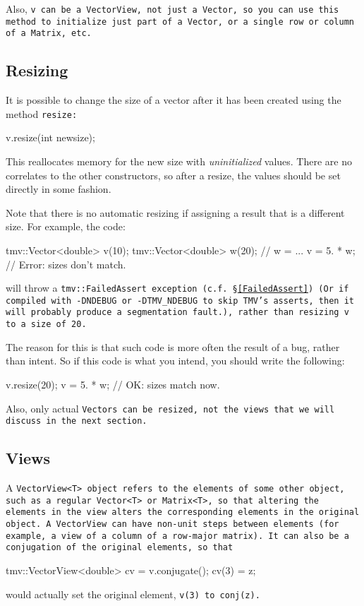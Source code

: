Also, \tt{v} can be a \tt{VectorView}, not just a \tt{Vector}, so you can use this method to 
initialize just part of a \tt{Vector}, or a single row or column of a \tt{Matrix}, etc.

\subsection{Resizing}
\label{Vector_Resize}

It is possible to change the size of a vector after it has been created using the method \tt{resize}:

\begin{tmvcode}
v.resize(int newsize);
\end{tmvcode}
This reallocates memory for the new size with {\em uninitialized} values.  
There are no correlates to the other constructors, so after a resize, the 
values should be set directly in some fashion.

Note that there is no automatic resizing if assigning a result that is a different size. 
For example, the code:
\begin{tmvcode}
tmv::Vector<double> v(10);
tmv::Vector<double> w(20);
// w = ...
v = 5. * w;  // Error: sizes don't match.
\end{tmvcode}
will throw a \tt{tmv::FailedAssert} exception (c.f. \S\ref{FailedAssert}) (Or if compiled with 
\tt{-DNDEBUG} or \tt{-DTMV\_NDEBUG} to skip TMV's asserts, then it will probably produce a segmentation fault.),
rather than resizing \tt{v} to a size of 20.  

The reason for this is that such code is more often the result of a bug, rather than intent.
So if this code is what you intend, you should write the following:
\begin{tmvcode}
v.resize(20);
v = 5. * w;  // OK: sizes match now.
\end{tmvcode}

Also, only actual \tt{Vector}s can be resized, not the views that we will discuss in the next section.

\subsection{Views}
\label{Vector_Views}

A \tt{VectorView<T>} object refers to the elements of some other object, such as a regular
\tt{Vector<T>} or \tt{Matrix<T>},
so that altering the elements in the view alters the
corresponding elements in the original object.  A \tt{VectorView}
can have non-unit
steps between elements (for example, a view of a column of a row-major
matrix).  It can also be a conjugation of the original
elements, so that
\begin{tmvcode}
tmv::VectorView<double> cv = v.conjugate();
cv(3) = z;
\end{tmvcode}
would actually set the original element, \tt{v(3)} to \tt{conj(z)}. 

